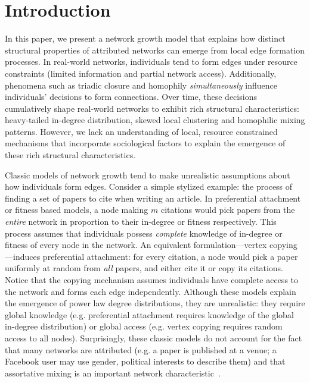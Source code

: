 \section{Introduction}
\label{sec:Introduction}



In this paper, we present a network growth model that explains how distinct structural properties of attributed networks can emerge from local edge formation processes. In real-world networks, individuals tend to form edges under resource constraints (limited information and partial network access). Additionally, phenomena such as triadic closure and homophily \textit{simultaneously} influence individuals’ decisions to form connections. Over time, these decisions cumulatively shape real-world networks to exhibit rich structural characteristics: heavy-tailed in-degree distribution, skewed local clustering and homophilic mixing patterns. However, we lack an understanding of local, resource constrained mechanisms that incorporate sociological factors to explain the emergence of these rich structural characteristics. 




Classic models of network growth tend to make unrealistic assumptions about how
individuals form edges. Consider a simple stylized example: the process of
finding a set of papers to cite when writing an article. In preferential
attachment \cite{barabasi1999emergence} or fitness \cite{X} based models, a node
making $m$ citations would pick papers from the \textit{entire} network in
proportion to their in-degree or fitness respectively. This process assumes that
individuals possess \textit{complete} knowledge of in-degree or fitness of every node in
the network. An equivalent formulation---vertex copying \cite{X}---induces
preferential attachment: for every citation, a node would pick a paper uniformly
at random from \textit{all} papers, and either cite it or copy its citations.
Notice that the copying mechanism assumes individuals have complete access to
the network and forms each edge independently. Although these models explain the
emergence of power law degree distributions, they are unrealistic: they require global knowledge (e.g. preferential attachment requires knowledge of the global in-degree distribution) or global access (e.g. vertex copying requires random access to all nodes). Surprisingly, these classic models do not account for the fact that many networks are attributed (e.g. a paper is published at a venue; a Facebook user may use gender, political interests to describe them) and that assortative mixing is an important network characteristic~\cite{newman2002assortative}.

